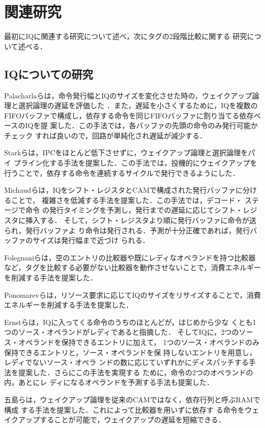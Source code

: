 %
%
\chapter{関連研究}
最初にIQに関連する研究について述べ，次にタグの2段階比較に関する
研究について述べる．
\section{IQについての研究}
Palacharlaらは，命令発行幅とIQのサイズを変化させた時の，ウェイクアップ論理と選択論理の遅延を評価した
\cite{Palacharla1997}．また，遅延を小さくするために，IQを複数の
FIFOバッファで構成し，依存する命令を同じFIFOバッファに割り当てる依存ベースのIQを提
案した．この手法では，各バッファの先頭の命令のみ発行可能かチェック
すれば良いので，回路が単純化され遅延が減少する．

Starkらは，IPCをほとんど低下させずに，ウェイクアップ論理と選択論理をパイ
プライン化する手法を提案した\cite{Stark2000}．この手法では，投機的にウェイクアップを行うことで，依存する命令を連続するサイクルで発行できるようにした．

Michaudらは，IQをシフト・レジスタとCAMで構成された発行バッファに分けることで，
複雑さを低減する手法を提案した\cite{Michaud2001}．この手法では，デコード・
ステージで命令
の発行タイミングを予測し，発行までの遅延に応じてシフト・レジスタに挿入する．
そして，シフト・レジスタより順に発行バッファに命令が送られ，発行バッファよ
り命令は発行される．予測が十分正確であれば，発行バッファのサイズは発行幅まで近づけ
られる．

Folegnaniらは，空のエントリの比較器や既にレディなオペランドを持つ比較器
など，タグを比較する必要がない比較器を動作させないことで，消費エネルギー
を削減する手法を提案した\cite{folegnani2001}．

Ponomarevらは，リソース要求に応じてIQのサイズをリサイズすることで，消費
エネルギーを削減する手法を提案した\cite{ponomarev2001}．

Ernstらは，IQに入ってくる命令のうちのほとんどが，はじめから少な
くとも1つのソース・オペランドがレディであると指摘した\cite{ernst2002}．
そしてIQに，2つのソース・オペランドを保持できるエントリに加えて，
1つのソース・オペランドのみ保持できるエントリと，ソース・オペランドを保
持しないエントリを用意し，レディでないソース・オペラ
ンドの数に応じていずれかにディスパッチする手法を提案した．さらにこの手法を実現する
ために，命令の2つのオペランドの内，あとにレ
ディになるオペランドを予測する手法も提案した．

五島らは，ウェイクアップ論理を従来のCAMではなく，依存行列と呼ぶRAMで構成
する手法を提案した\cite{goshima2001}．これによって比較器を用いずに依存す
る命令をウェイクアップすることが可能で，ウェイクアップの遅延を短縮できる．

